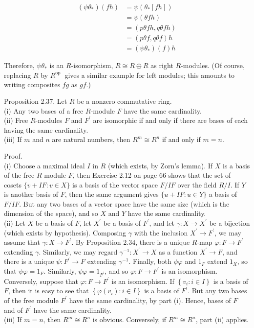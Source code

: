 \documentclass[10pt]{article}
\begin{document}
$$
\begin{aligned}
\left(\psi \theta_{*}\right)(f h) & =\psi\left(\theta_{*}[f h]\right) \\
& =\psi(\theta f h) \\
& =(p \theta f h, q \theta f h) \\
& =(p \theta f, q \theta f) h \\
& =\left(\psi \theta_{*}\right)(f) h
\end{aligned}
$$

Therefore, $\psi \theta_{*}$ is an $R$-isomorphism, $R \cong R \oplus R$ as right $R$-modules. (Of course, replacing $R$ by $R^{\text {op }}$ gives a similar example for left modules; this amounts to writing composites $f g$ as $g f$.)

Proposition 2.37. Let $R$ be a nonzero commutative ring.\\
(i) Any two bases of a free $R$-module $F$ have the same cardinality.\\
(ii) Free $R$-modules $F$ and $F^{\prime}$ are isomorphic if and only if there are bases of each having the same cardinality.\\
(iii) If $m$ and $n$ are natural numbers, then $R^{m} \cong R^{n}$ if and only if $m=n$.

Proof.\\
(i) Choose a maximal ideal $I$ in $R$ (which exists, by Zorn's lemma). If $X$ is a basis of the free $R$-module $F$, then Exercise 2.12 on page 66 shows that the set of cosets $\{v+I F: v \in X\}$ is a basis of the vector space $F / I F$ over the field $R / I$. If $Y$ is another basis of $F$, then the same argument gives $\{u+I F: u \in Y\}$ a basis of $F / I F$. But any two bases of a vector space have the same size (which is the dimension of the space), and so $X$ and $Y$ have the same cardinality.\\
(ii) Let $X$ be a basis of $F$, let $X^{\prime}$ be a basis of $F^{\prime}$, and let $\gamma: X \rightarrow X^{\prime}$ be a bijection (which exists by hypothesis). Composing $\gamma$ with the inclusion $X^{\prime} \rightarrow F^{\prime}$, we may assume that $\gamma: X \rightarrow F^{\prime}$. By Proposition 2.34, there is a unique $R$-map $\varphi: F \rightarrow F^{\prime}$ extending $\gamma$. Similarly, we may regard $\gamma^{-1}: X^{\prime} \rightarrow X$ as a function $X^{\prime} \rightarrow F$, and there is a unique $\psi: F^{\prime} \rightarrow F$ extending $\gamma^{-1}$. Finally, both $\psi \varphi$ and $1_{F}$ extend $1_{X}$, so that $\psi \varphi=1_{F}$. Similarly, $\psi \varphi=1_{F^{\prime}}$, and so $\varphi: F \rightarrow F^{\prime}$ is an isomorphism.\\
Conversely, suppose that $\varphi: F \rightarrow F^{\prime}$ is an isomorphism. If $\left\{v_{i}: i \in I\right\}$ is a basis of $F$, then it is easy to see that $\left\{\varphi\left(v_{i}\right): i \in I\right\}$ is a basis of $F^{\prime}$. But any two bases of the free module $F^{\prime}$ have the same cardinality, by part (i). Hence, bases of $F$ and of $F^{\prime}$ have the same cardinality.\\
(iii) If $m=n$, then $R^{m} \cong R^{n}$ is obvious. Conversely, if $R^{m} \cong R^{n}$, part (ii) applies.
\end{document}
